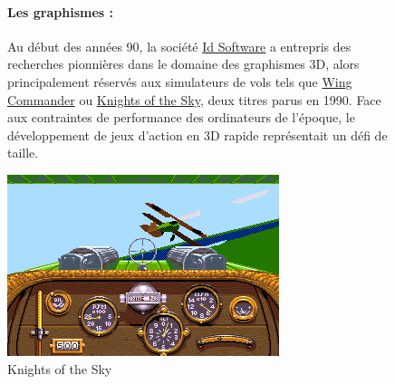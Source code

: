 \documentclass[12pt]{report}
\begin{document}
\begin{figure}[H]
    \begin{minipage}{0.48\textwidth}
        \paragraph{Les graphismes : }
		Au début des années 90, la société \href{https://fr.wikipedia.org/wiki/Id_Software}{Id Software} a entrepris des 
		recherches pionnières dans le domaine des graphismes 3D, alors principalement réservés aux simulateurs de vols tels 
		que \href{https://fr.wikipedia.org/wiki/Wing_Commander_(jeu_vid%C3%A9o)}{Wing Commander} ou 
		\href{https://en.wikipedia.org/wiki/Knights_of_the_Sky}{Knights of the Sky}, deux titres parus en 1990. Face aux 
		contraintes de performance des ordinateurs de l'époque, le développement de jeux d'action en 3D rapide représentait 
		un défi de taille. 
    \end{minipage}\hfill
    \begin{minipage}{0.48\textwidth}
        \centering
        \includegraphics[width=\linewidth]{image/knights-of-the-sky.png}
		\hspace*{-0.5cm}
        \caption{Knights of the Sky}
        \label{fig:knights-of-the-sky}
    \end{minipage}
\end{figure}
\end{document}
